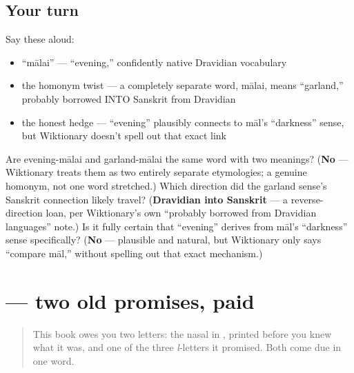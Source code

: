 \subsection*{Your turn}
Say these aloud:

\begin{itemize}
\raggedright
  \item \textquotedblleft{}mālai\textquotedblright{} — \textquotedblleft{}evening,\textquotedblright{} confidently native Dravidian vocabulary
  \item the homonym twist — a completely separate word, mālai, means \textquotedblleft{}garland,\textquotedblright{} probably borrowed INTO Sanskrit from Dravidian
  \item the honest hedge — \textquotedblleft{}evening\textquotedblright{} plausibly connects to māl's \textquotedblleft{}darkness\textquotedblright{} sense, but Wiktionary doesn't spell out that exact link
\end{itemize}

\begin{tcolorbox}[breakable,colback=teal!4,colframe=teal!35!black,title={Before you move on}]
Are evening-mālai and garland-mālai the same word with two meanings? (\textbf{No} — Wiktionary treats them as two entirely separate etymologies; a genuine homonym, not one word stretched.) Which direction did the garland sense's Sanskrit connection likely travel? (\textbf{Dravidian into Sanskrit} — a reverse-direction loan, per Wiktionary's own \textquotedblleft{}probably borrowed from Dravidian languages\textquotedblright{} note.) Is it fully certain that \textquotedblleft{}evening\textquotedblright{} derives from māl's \textquotedblleft{}darkness\textquotedblright{} sense specifically? (\textbf{No} — plausible and natural, but Wiktionary only says \textquotedblleft{}compare māl,\textquotedblright{} without spelling out that exact mechanism.)
\end{tcolorbox}
\section[\texorpdfstring{\ta{நீங்கள்} (nīṅgaḷ)}{நீங்கள் (nīṅgaḷ)}]{ — two old promises, paid}

\label{lesson:TA-W11-read-niingal}



\begin{quote}
This book owes you two letters: the nasal in \textbf{}, printed before you knew what it was, and one of the three \emph{l}-letters it promised. Both come due in one word.
\end{quote}

